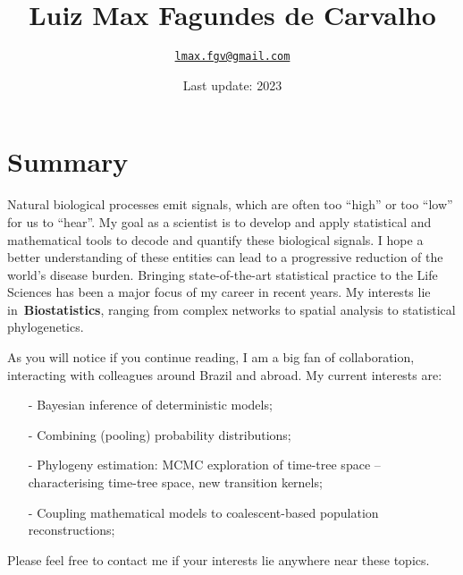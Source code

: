 \documentclass[10pt]{article}
\title{\bfseries Luiz Max Fagundes de Carvalho}
\author{\href{mailto:lmax.fgc@gmail.com}{\nolinkurl{lmax.fgv@gmail.com}}}
\affil{School of Applied Mathematics (EMAp), Getulio Vargas Foundation, Brazil.}
\date{Last update:  2023}
\begin{document}
\maketitle

\section*{Summary}

Natural biological processes emit signals, which are often too ``high'' or too ``low'' for us to ``hear''.
My goal as a scientist is to develop and apply statistical and mathematical tools to decode and quantify these biological signals.
I hope a better understanding of these entities can lead to a progressive reduction of the world's disease burden.
Bringing state-of-the-art statistical practice to the Life Sciences has been a major focus of my career in recent years.
My interests lie in~\textbf{Biostatistics}, ranging from complex networks to spatial analysis to statistical phylogenetics.


As you will notice if you continue reading, I am a big fan of collaboration, interacting with colleagues around Brazil and abroad.
My current interests are:
\begin{itemize}
\itemsep0.1em
 \item [-] Bayesian inference of deterministic models;
 \item [-] Combining (pooling) probability distributions;
 \item [-] Phylogeny estimation: MCMC exploration of time-tree space -- characterising time-tree space, new transition kernels;
 \item [-] Coupling mathematical models to coalescent-based population reconstructions;
\end{itemize}

Please feel free to contact me if your interests lie anywhere near these topics.
\end{document}
